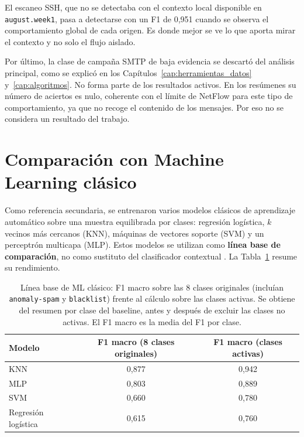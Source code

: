 El escaneo SSH, que no se detectaba con el contexto local disponible en \texttt{august.week1}, pasa a detectarse con un F1 de 0,951 cuando se observa el comportamiento global de cada origen. Es donde mejor se ve lo que aporta mirar el contexto y no solo el flujo aislado.

Por último, la clase de campaña SMTP de baja evidencia se descartó del análisis principal, como se explicó en los Capítulos~\ref{cap:herramientas_datos} y~\ref{cap:algoritmos}. No forma parte de los resultados activos. En los resúmenes su número de aciertos es nulo, coherente con el límite de NetFlow para este tipo de comportamiento, ya que no recoge el contenido de los mensajes. Por eso no se considera un resultado del trabajo.

\section{Comparación con Machine Learning clásico}
\label{sec:exp_ml}

Como referencia secundaria, se entrenaron varios modelos clásicos de aprendizaje automático sobre una muestra equilibrada por clases: regresión logística, $k$ vecinos más cercanos (KNN), máquinas de vectores soporte (SVM) y un perceptrón multicapa (MLP). Estos modelos se utilizan como \textbf{línea base de comparación}, no como sustituto del clasificador contextual \cite{buczak2016survey}. La Tabla~\ref{tab:exp_ml} resume su rendimiento.

\begin{table}[ht]
\centering
\small
\begin{tabular}{|l|c|c|}
\hline
\textbf{Modelo} & \textbf{F1 macro (8 clases originales)} & \textbf{F1 macro (clases activas)} \\
\hline
KNN & 0,877 & 0,942 \\
\hline
MLP & 0,803 & 0,889 \\
\hline
SVM & 0,660 & 0,780 \\
\hline
Regresión logística & 0,615 & 0,760 \\
\hline
\end{tabular}
\caption{Línea base de ML clásico: F1 macro sobre las 8 clases originales (incluían \texttt{anomaly-spam} y \texttt{blacklist}) frente al cálculo sobre las clases activas. Se obtiene del resumen por clase del baseline, antes y después de excluir las clases no activas. El F1 macro es la media del F1 por clase.}
\label{tab:exp_ml}
\end{table}

